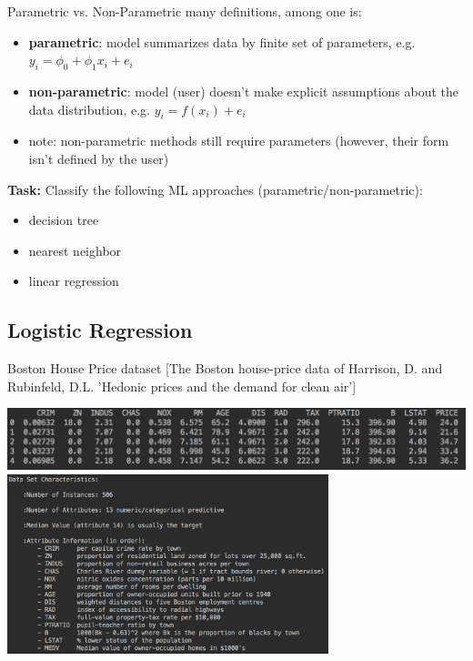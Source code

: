 \documentclass{beamer}
\begin{document}
\begin{frame}{Parametric vs. Non-Parametric}
many definitions, among one is:
\begin{itemize}
\item \textbf{parametric}: model summarizes data by finite set of parameters, e.g. $y_i=\phi_0 + \phi_1x_i + e_i$ 
\item \textbf{non-parametric}: model (user) doesn't make explicit assumptions about the data distribution, e.g. $y_i = f(x_i) + e_i$
\item note: non-parametric methods still require parameters (however, their form isn't defined by the user)
\end{itemize}
\textbf{Task:} Classify the following ML approaches (parametric/non-parametric):
\begin{itemize}
\item decision tree
\item nearest neighbor
\item linear regression
\end{itemize}
\end{frame}


\subsection{Logistic Regression}

\begin{frame}{Boston House Price dataset}
[The Boston house-price data of Harrison, D. and Rubinfeld, D.L. 'Hedonic
prices and the demand for clean air']
\begin{center}
\includegraphics[width=1\textwidth]{boston}\\
\includegraphics[width=0.7\textwidth, trim=0 9cm 0 0cm]{boston_descr}
\end{center}
\end{frame}
\end{document}
